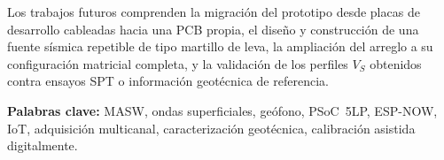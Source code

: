 Los trabajos futuros comprenden la migraci\'on del prototipo desde placas de
desarrollo cableadas hacia una PCB propia, el dise\~no y construcci\'on de una fuente
s\'ismica repetible de tipo martillo de leva, la ampliaci\'on del arreglo a su
configuraci\'on matricial completa, y la validaci\'on de los perfiles $V_S$ obtenidos
contra ensayos SPT o informaci\'on geot\'ecnica de referencia.

\vspace{0.3cm}
\noindent\textbf{Palabras clave:} MASW, ondas superficiales, ge\'ofono, PSoC~5LP,
ESP-NOW, IoT, adquisici\'on multicanal, caracterizaci\'on geot\'ecnica, calibraci\'on
asistida digitalmente.
